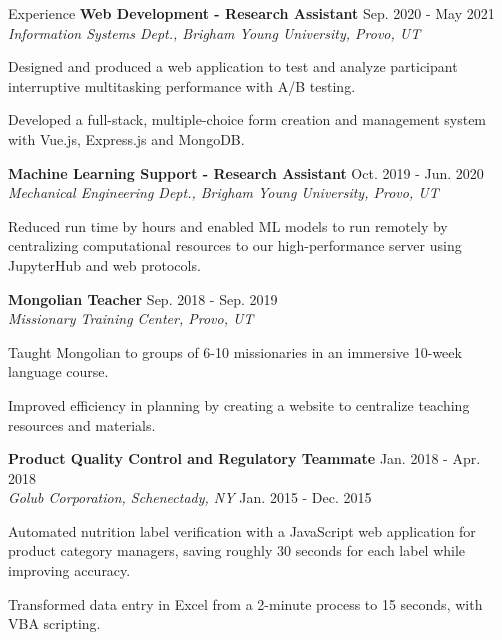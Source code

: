 \documentclass{resume} %
\begin{document}
\begin{rSection}{Experience}
    \textbf{Web Development - Research Assistant}\hfill{ Sep.  2020 - May 2021}\\
    \textit{Information Systems Dept., Brigham Young University, Provo, UT} 
    \begin{compactitem}
        \item Designed and produced a web application to test and analyze participant interruptive
            multitasking performance with A/B testing.
        \item Developed a full-stack, multiple-choice form creation and management system with
            Vue.js, Express.js and MongoDB.
    \end{compactitem}
\textbf{Machine Learning Support - Research Assistant} \hfill{Oct. 2019
- Jun. 2020}\\
\textit{Mechanical Engineering Dept., Brigham Young University, Provo, UT}
    \begin{compactitem}
        \item Reduced run time by hours and enabled ML models to run remotely by centralizing
            computational resources to our high-performance server using JupyterHub and web
            protocols.
    \end{compactitem}
\textbf{Mongolian Teacher} \hfill {Sep. 2018 - Sep. 2019}\\
\textit{Missionary Training Center, Provo, UT} 
    \begin{compactitem}
        \item Taught Mongolian to groups of 6-10 missionaries in an immersive 10-week language
            course.
        \item Improved efficiency in planning by creating a website to centralize teaching
            resources and materials.
    \end{compactitem}
\textbf{Product Quality Control and Regulatory Teammate}    \hfill {Jan. 2018 -
Apr. 2018}\\
\textit{Golub Corporation, Schenectady, NY}                 \hfill {Jan. 2015 -
Dec. 2015}  
    \begin{compactitem}
        \item Automated nutrition label verification with a JavaScript web application for product
            category managers, saving roughly 30 seconds for each label while improving accuracy.
        \item Transformed data entry in Excel from a 2-minute process to 15 seconds, with
            VBA scripting.
    \end{compactitem}
\end{rSection}
\end{document}
